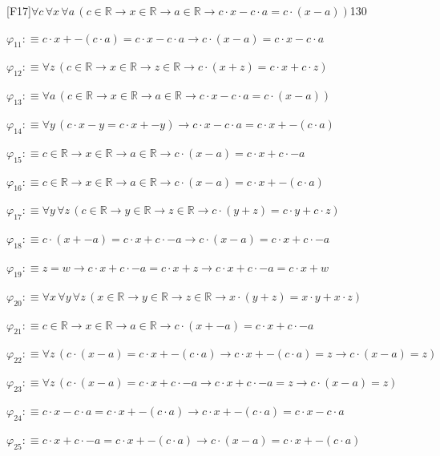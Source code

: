 \begin{fullproof}{[F17]}{$\forall c\,\forall x\,\forall a\,(c \in \mathbb{R} \to x \in \mathbb{R} \to a \in \mathbb{R} \to c \cdot x - c \cdot a = c \cdot (x - a))$}{130}
\begin{abbrevlist}
\item $\varphi_{11} :\equiv c \cdot x + -(c \cdot a) = c \cdot x - c \cdot a \to c \cdot (x - a) = c \cdot x - c \cdot a$
\item $\varphi_{12} :\equiv \forall z\,(c \in \mathbb{R} \to x \in \mathbb{R} \to z \in \mathbb{R} \to c \cdot (x + z) = c \cdot x + c \cdot z)$
\item $\varphi_{13} :\equiv \forall a\,(c \in \mathbb{R} \to x \in \mathbb{R} \to a \in \mathbb{R} \to c \cdot x - c \cdot a = c \cdot (x - a))$
\item $\varphi_{14} :\equiv \forall y\,(c \cdot x - y = c \cdot x + -y) \to c \cdot x - c \cdot a = c \cdot x + -(c \cdot a)$
\item $\varphi_{15} :\equiv c \in \mathbb{R} \to x \in \mathbb{R} \to a \in \mathbb{R} \to c \cdot (x - a) = c \cdot x + c \cdot -a$
\item $\varphi_{16} :\equiv c \in \mathbb{R} \to x \in \mathbb{R} \to a \in \mathbb{R} \to c \cdot (x - a) = c \cdot x + -(c \cdot a)$
\item $\varphi_{17} :\equiv \forall y\,\forall z\,(c \in \mathbb{R} \to y \in \mathbb{R} \to z \in \mathbb{R} \to c \cdot (y + z) = c \cdot y + c \cdot z)$
\item $\varphi_{18} :\equiv c \cdot (x + -a) = c \cdot x + c \cdot -a \to c \cdot (x - a) = c \cdot x + c \cdot -a$
\item $\varphi_{19} :\equiv z = w \to c \cdot x + c \cdot -a = c \cdot x + z \to c \cdot x + c \cdot -a = c \cdot x + w$
\item $\varphi_{20} :\equiv \forall x\,\forall y\,\forall z\,(x \in \mathbb{R} \to y \in \mathbb{R} \to z \in \mathbb{R} \to x \cdot (y + z) = x \cdot y + x \cdot z)$
\item $\varphi_{21} :\equiv c \in \mathbb{R} \to x \in \mathbb{R} \to a \in \mathbb{R} \to c \cdot (x + -a) = c \cdot x + c \cdot -a$
\item $\varphi_{22} :\equiv \forall z\,(c \cdot (x - a) = c \cdot x + -(c \cdot a) \to c \cdot x + -(c \cdot a) = z \to c \cdot (x - a) = z)$
\item $\varphi_{23} :\equiv \forall z\,(c \cdot (x - a) = c \cdot x + c \cdot -a \to c \cdot x + c \cdot -a = z \to c \cdot (x - a) = z)$
\item $\varphi_{24} :\equiv c \cdot x - c \cdot a = c \cdot x + -(c \cdot a) \to c \cdot x + -(c \cdot a) = c \cdot x - c \cdot a$
\item $\varphi_{25} :\equiv c \cdot x + c \cdot -a = c \cdot x + -(c \cdot a) \to c \cdot (x - a) = c \cdot x + -(c \cdot a)$

\end{abbrevlist}
\end{fullproof}
